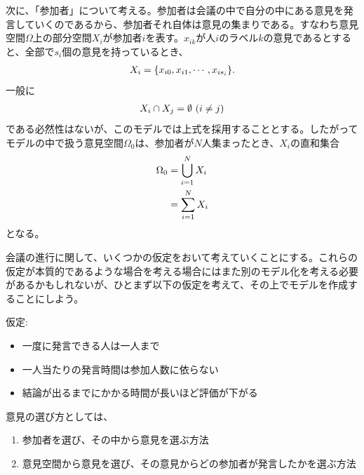 \documentclass[letterpaper,10pt,english]{sphinxmanual}
\begin{document}
次に、「参加者」について考える。参加者は会議の中で自分の中にある意見を発言していくのであるから、参加者それ自体は意見の集まりである。すなわち意見空間\(\Omega\)上の部分空間\(X_{i}\)が参加者\(i\)を表す。\(x_{ik}\)が人\(i\)のラベル\(k\)の意見であるとすると、全部で\(s_{i}\)個の意見を持っているとき、
\begin{gather}
\begin{split}X_{i} = \{x_{i0}, x_{i1}, \cdots , x_{is_{i}}\}.\end{split}\notag
\end{gather}
一般に
\begin{gather}
\begin{split}X_{i}\cap X_{j} = \emptyset\ (i \neq j)\end{split}\notag
\end{gather}
である必然性はないが、このモデルでは上式を採用することとする。したがってモデルの中で扱う意見空間\(\Omega_{0}\)は、参加者が\(N\)人集まったとき、\(X_{i}\)の直和集合
\begin{gather}
\begin{split}\begin{align}\Omega_{0} &= \bigcup_{i = 1}^{N} X_{i}\\
&= \sum_{i=1}^{N} X_{i} \end{align}\end{split}\notag
\end{gather}
となる。

会議の進行に関して、いくつかの仮定をおいて考えていくことにする。これらの仮定が本質的であるような場合を考える場合にはまた別のモデル化を考える必要があるかもしれないが、ひとまず以下の仮定を考えて、その上でモデルを作成することにしよう。

仮定:
\begin{itemize}
\item {} 
一度に発言できる人は一人まで

\item {} 
一人当たりの発言時間は参加人数に依らない

\item {} 
結論が出るまでにかかる時間が長いほど評価が下がる

\end{itemize}

意見の選び方としては、
\begin{enumerate}
\item {} 
参加者を選び、その中から意見を選ぶ方法

\item {} 
意見空間から意見を選び、その意見からどの参加者が発言したかを選ぶ方法

\end{enumerate}
\end{document}
